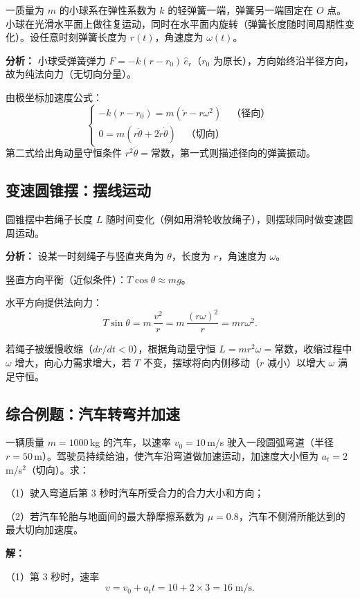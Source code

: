 \documentclass[12pt,a4paper]{article}
\begin{document}
一质量为 $m$ 的小球系在弹性系数为 $k$ 的轻弹簧一端，弹簧另一端固定在 $O$ 点。小球在光滑水平面上做往复运动，同时在水平面内旋转（弹簧长度随时间周期性变化）。设任意时刻弹簧长度为 $r(t)$，角速度为 $\omega(t)$。

\textbf{分析：} 小球受弹簧弹力 $F = -k(r-r_0)\,\hat{e}_r$（$r_0$ 为原长），方向始终沿半径方向，故为纯法向力（无切向分量）。

由极坐标加速度公式：
\[
\begin{cases}
-k(r-r_0) = m(\ddot{r} - r\omega^2) \quad\text{（径向）}\\[6pt]
0 = m(r\ddot{\theta} + 2\dot{r}\dot{\theta}) \quad\text{（切向）}
\end{cases}
\]
第二式给出角动量守恒条件 $r^2\dot{\theta} = \text{常数}$，第一式则描述径向的弹簧振动。

\subsection{变速圆锥摆：摆线运动}

圆锥摆中若绳子长度 $L$ 随时间变化（例如用滑轮收放绳子），则摆球同时做变速圆周运动。

\textbf{分析：} 设某一时刻绳子与竖直夹角为 $\theta$，长度为 $r$，角速度为 $\omega$。

竖直方向平衡（近似条件）：$T\cos\theta \approx mg$。

水平方向提供法向力：
\[
T\sin\theta = m\,\frac{v^2}{r} = m\,\frac{(r\omega)^2}{r} = m r\omega^2.
\]

若绳子被缓慢收缩（$dr/dt < 0$），根据角动量守恒 $L = mr^2\omega = \text{常数}$，收缩过程中 $\omega$ 增大，向心力需求增大，若 $T$ 不变，摆球将向内侧移动（$r$ 减小）以增大 $\omega$ 满足守恒。

\subsection{综合例题：汽车转弯并加速}

一辆质量 $m=1000\,$kg 的汽车，以速率 $v_0=10\,$m/s 驶入一段圆弧弯道（半径 $r=50\,$m）。驾驶员持续给油，使汽车沿弯道做加速运动，加速度大小恒为 $a_t=2\,$m/s$^2$（切向）。求：

（1）驶入弯道后第 3 秒时汽车所受合力的合力大小和方向；

（2）若汽车轮胎与地面间的最大静摩擦系数为 $\mu=0.8$，汽车不侧滑所能达到的最大切向加速度。

\textbf{解：}

（1）第 3 秒时，速率
\[
v = v_0 + a_t t = 10 + 2\times 3 = 16\;\text{m/s}.
\]
\end{document}
